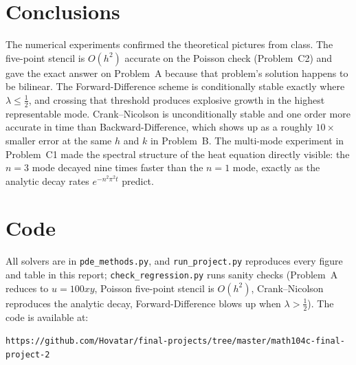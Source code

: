 \documentclass[11pt]{article}
\begin{document}
\section{Conclusions}
The numerical experiments confirmed the theoretical pictures from class.
The five-point stencil is $O(h^{2})$ accurate on the Poisson check (Problem~C2)
and gave the exact answer on Problem~A because that problem's solution happens
to be bilinear. The Forward-Difference scheme is conditionally stable exactly
where $\lambda \le \tfrac12$, and crossing that threshold produces explosive
growth in the highest representable mode. Crank--Nicolson is unconditionally
stable and one order more accurate in time than Backward-Difference, which
shows up as a roughly $10\times$ smaller error at the same $h$ and $k$ in
Problem~B. The multi-mode experiment in Problem~C1 made the spectral structure
of the heat equation directly visible: the $n = 3$ mode decayed nine times
faster than the $n = 1$ mode, exactly as the analytic decay rates
$e^{-n^{2}\pi^{2}t}$ predict.

\section{Code}
\label{sec:code}
All solvers are in \texttt{pde\_methods.py}, and \texttt{run\_project.py}
reproduces every figure and table in this report;
\texttt{check\_regression.py} runs sanity checks (Problem~A reduces to
$u = 100xy$, Poisson five-point stencil is $O(h^{2})$, Crank--Nicolson
reproduces the analytic decay, Forward-Difference blows up when
$\lambda > \tfrac12$). The code is available at:

\begin{center}
\texttt{https://github.com/Hovatar/final-projects/tree/master/math104c-final-project-2}
\end{center}
\end{document}

